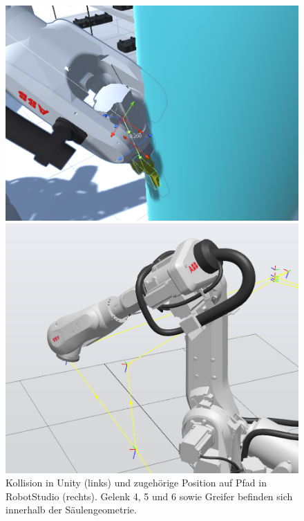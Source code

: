 \begin{figure}[!htb]
  \centering
  \begin{minipage}{.535\textwidth}
    \centering
    \includegraphics[width=0.9\linewidth]{Figures/CollisionUnity.png}
  \end{minipage}%
  \begin{minipage}{0.465\textwidth}
    \centering
    \includegraphics[width=0.9\linewidth]{Figures/CollisionPathRobotStudio.png}
  \end{minipage}
  \caption{Kollision in Unity (links) und zugehörige Position auf Pfad in
    RobotStudio (rechts). Gelenk 4, 5 und 6 sowie Greifer befinden
    sich innerhalb der
  Säulengeometrie.}
  \label{figure:kollision}
\end{figure}

